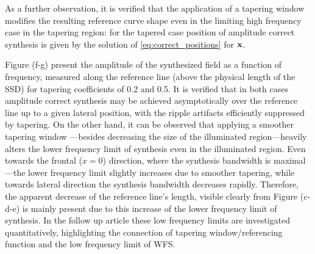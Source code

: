 \documentclass[lettersize,journal]{IEEEtran}
\begin{document}
As a further observation, it is verified that the application of a tapering window modifies the resulting reference curve shape even in the limiting high frequency case in the tapering region: for the tapered case position of amplitude correct synthesis is given by the solution of \eqref{eq:correct_positions} for $\mathbf{x}$.

Figure (f-g) present the amplitude of the synthesized field as a function of frequency, measured along the reference line (above the physical length of the SSD) for tapering coefficients of 0.2 and 0.5.
It is verified that in both cases amplitude correct synthesis may be achieved asymptotically over the reference line up to a given lateral position, with the ripple artifacts efficiently suppressed by tapering.
On the other hand, it can be observed that applying a smoother tapering window ---besides decreasing the size of the illuminated region---heavily alters the lower frequency limit of synthesis even in the illuminated region.
Even towards the frontal ($x=0$) direction, where the synthesis bandwidth is maximal---the lower frequency limit slightly increases due to smoother tapering, while towards lateral direction the synthesis bandwidth decreases rapidly.
Therefore, the apparent decrease of the reference line's length, visible clearly from Figure (c-d-e) is mainly present due to this increase of the lower frequency limit of synthesis.
In the follow up article these low frequency limits are investigated quantitatively, highlighting the connection of tapering window/referencing function and the low frequency limit of WFS.

%
\end{document}
